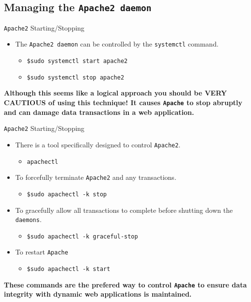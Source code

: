 \documentclass[xcolor=table]{beamer}
\begin{document}
\subsection{Managing the \texttt{Apache2 daemon}}
\begin{frame}{\texttt{Apache2} Starting/Stopping}
  \begin{itemize}
    \item The \texttt{Apache2 daemon} can be controlled by the \texttt{systemctl} command.
      \begin{itemize}
        \item \texttt{\$sudo systemctl start apache2}
        \item \texttt{\$sudo systemctl stop apache2}
      \end{itemize}
  \end{itemize}
  \begin{tcolorbox}
    \begin{center}
      \scriptsize \textbf{Although this seems like a logical approach you should be VERY CAUTIOUS of using this technique! It causes \texttt{Apache} to stop abruptly and can damage data transactions in a web application.}
    \end{center}
  \end{tcolorbox}
\end{frame}

\begin{frame}{\texttt{Apache2} Starting/Stopping}
  \begin{itemize}
    \item There is a tool specifically designed to control \texttt{Apache2}.
      \begin{itemize}
        \item \texttt{apachectl}
      \end{itemize}
    \item To forcefully terminate \texttt{Apache2} and any transactions.
      \begin{itemize}
        \item \texttt{\$sudo apachectl -k stop}
      \end{itemize}
    \item To gracefully allow all transactions to complete before shutting down the \texttt{daemons}. 
      \begin{itemize}
        \item \texttt{\$sudo apachectl -k graceful-stop}
      \end{itemize}
    \item To restart \texttt{Apache}
      \begin{itemize}
        \item \texttt{\$sudo apachectl -k start}
      \end{itemize}
  \end{itemize}
  \begin{tcolorbox}
    \begin{center}
      \scriptsize \textbf{These commands are the prefered way to control \texttt{Apache} to ensure data integrity with dynamic web applications is maintained.}
    \end{center}
  \end{tcolorbox}
\end{frame}
\end{document}
